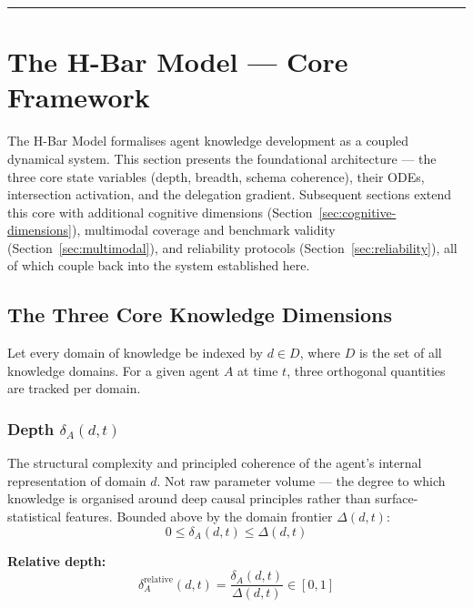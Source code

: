 \documentclass[11pt,a4paper]{article}
\begin{document}
\noindent\rule{\linewidth}{0.4pt}

\section{The H-Bar Model --- Core Framework}\label{sec:core-framework}

The H-Bar Model formalises agent knowledge development as a coupled
dynamical system. This section presents the foundational architecture
--- the three core state variables (depth, breadth, schema coherence),
their ODEs, intersection activation, and the delegation gradient.
Subsequent sections extend this core with additional cognitive
dimensions (Section~\ref{sec:cognitive-dimensions}), multimodal coverage
and benchmark validity (Section~\ref{sec:multimodal}), and reliability
protocols (Section~\ref{sec:reliability}), all of which couple back into
the system established here.

\subsection{The Three Core Knowledge Dimensions}\label{sec:three-core}

Let every domain of knowledge be indexed by $d \in D$, where $D$ is the
set of all knowledge domains. For a given agent $A$ at time $t$, three
orthogonal quantities are tracked per domain.

\subsubsection{Depth \texorpdfstring{$\delta_A(d,t)$}{delta\_A(d,t)}}\label{sec:depth}

The structural complexity and principled coherence of the agent's
internal representation of domain $d$. Not raw parameter volume ---
the degree to which knowledge is organised around deep causal principles
rather than surface-statistical features. Bounded above by the domain
frontier $\Delta(d,t)$:
\begin{equation}\label{eq:depth-bounds}
0 \leq \delta_A(d,t) \leq \Delta(d,t)
\end{equation}

\textbf{Relative depth:}
\begin{equation}\label{eq:relative-depth}
\delta_A^{\text{relative}}(d,t) = \frac{\delta_A(d,t)}{\Delta(d,t)} \in [0,1]
\end{equation}
\end{document}
